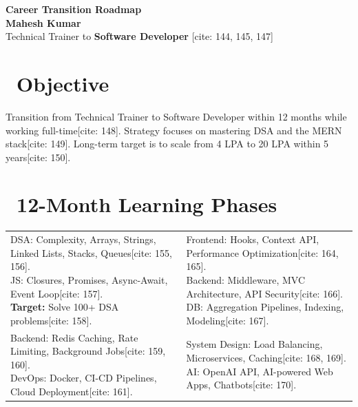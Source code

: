 \documentclass[10pt,letterpaper]{article}
\newcommand{\phaseCard}[2]{
    \begin{tcolorbox}[colback=white, colframe=DeepBlue, arc=3pt, title=\textbf{#1}, fonttitle=\small\bfseries]
        \small #2
    \end{tcolorbox}
}
\begin{document}
\begin{center}
    {\Huge \textbf{\color{DeepBlue}Career Transition Roadmap}} \\
    \vspace{4pt}
    {\large \textbf{Mahesh Kumar}} \\
    \vspace{2pt}
    \small Technical Trainer to \textbf{Software Developer} [cite: 144, 145, 147]
\end{center}

\section{\faBullseye \ Objective}
\small{Transition from Technical Trainer to Software Developer within 12 months while working full-time[cite: 148]. Strategy focuses on mastering DSA and the MERN stack[cite: 149]. Long-term target is to scale from 4 LPA to 20 LPA within 5 years[cite: 150].}

\section{\faRoute \ 12-Month Learning Phases}
\begin{tabularx}{\textwidth}{X X}
    \phaseCard{Phase 1: Foundations (Months 1-3)}{
        DSA: Complexity, Arrays, Strings, Linked Lists, Stacks, Queues[cite: 155, 156]. \\
        JS: Closures, Promises, Async-Await, Event Loop[cite: 157]. \\
        \textbf{Target:} Solve 100+ DSA problems[cite: 158].
    } & 
    \phaseCard{Phase 2: MERN Mastery (Months 4-6)}{
        Frontend: Hooks, Context API, Performance Optimization[cite: 164, 165]. \\
        Backend: Middleware, MVC Architecture, API Security[cite: 166]. \\
        DB: Aggregation Pipelines, Indexing, Modeling[cite: 167].
    } \\
    \phaseCard{Phase 3: Scaling (Months 7-9)}{
        Backend: Redis Caching, Rate Limiting, Background Jobs[cite: 159, 160]. \\
        DevOps: Docker, CI-CD Pipelines, Cloud Deployment[cite: 161].
    } & 
    \phaseCard{Phase 4: Design and AI (Months 10-12)}{
        System Design: Load Balancing, Microservices, Caching[cite: 168, 169]. \\
        AI: OpenAI API, AI-powered Web Apps, Chatbots[cite: 170].
    }
\end{tabularx}
\end{document}
